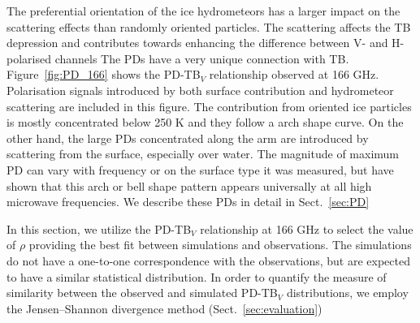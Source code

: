 \documentclass[amt, manuscript]{copernicus}
\begin{document}
The preferential orientation of the ice hydrometeors has a larger impact on the scattering effects than randomly oriented particles. The scattering affects the TB depression and contributes towards enhancing the difference between V- and H- polarised channels \citep{xie:polar:11}
The PDs have a very unique connection with TB. Figure~\ref{fig:PD_166} shows the PD-TB$_V$ relationship observed at 166\,\,GHz. Polarisation signals introduced by both surface contribution and hydrometeor scattering are included in this figure. The contribution from oriented ice particles is mostly concentrated below 250\,\,K and they follow a arch shape curve. On the other hand, the large PDs concentrated along the arm are introduced by scattering from the surface, especially over water. The magnitude of maximum PD can vary with frequency or on the surface type it was measured, but \citet{gong:micro:17} have shown that this arch or bell shape pattern appears universally at all high microwave frequencies. We describe these PDs in detail in Sect.~\ref{sec:PD} 

In this section, we utilize the PD-TB$_V$ relationship at 166\,\,GHz to select the value of $\rho$ providing the best fit between simulations and observations. The simulations do not have a one-to-one correspondence with the observations, but are expected to have a similar statistical distribution. In order to quantify the measure of similarity between the observed and simulated PD-TB$_V$ distributions, we employ the Jensen–Shannon divergence method (Sect.~\ref{sec:evaluation})
\end{document}
